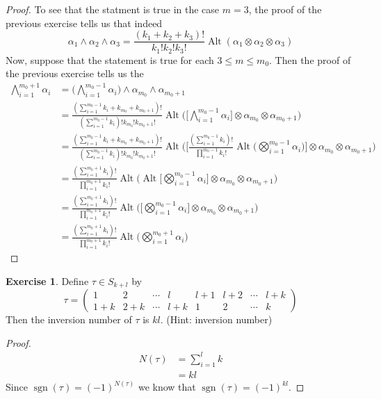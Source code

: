\documentclass{book}
\theoremstyle{definition}
\newtheorem{ex}[definition]{Exercise}
\newcommand{\al}{\alpha}
\DeclareMathOperator{\sgn}{sgn}
\DeclareMathOperator{\Alt}{Alt}
\DeclareMathOperator*{\0}{\mbf{0}}
\DeclareMathOperator*{\1}{\mbf{1}}
\begin{document}
	\begin{proof}
		To see that the statment is true in the case $m=3$, the proof of the previous exercise tells us that indeed $$\al_1 \wedge \al_2 \wedge \al_3 = \frac{(k_1 + k_2 + k_3)!}{k_1! k_2! k_3!}\Alt(\al_1 \otimes \al_2 \otimes \al_3)$$
		Now, suppose that the statement is true for each $3 \leq m \leq m_0$. Then the proof of the previous exercise tells us the 
		\begin{align*}
			\bigwedge_{i=1}^{m_0 +1} \al_i
			&= \bigg( \bigwedge_{i=1}^{m_0 -1} \al_i \bigg) \wedge \al_{m_0} \wedge \al_{m_0+1} \\
			&= \frac{(\sum_{i=1}^{m_0-1} k_i + k_{m_0} + k_{m_0+1})! }{(\sum_{i=1}^{m_0-1} k_i)! k_{m_0}! k_{m_0+1}!} \Alt \bigg( \bigg[ \bigwedge_{i=1}^{m_0-1} \al_i \bigg] \otimes \al_{m_0} \otimes \al_{m_0 +1}  \bigg) \\
			&= \frac{(\sum_{i=1}^{m_0-1} k_i + k_{m_0} + k_{m_0+1})! }{(\sum_{i=1}^{m_0-1} k_i)! k_{m_0}! k_{m_0+1}!} \Alt \bigg( \bigg[ \frac{(\sum_{i=1}^{m_0-1} k_i)!}{\prod_{i=1}^{m_0-1} k_i!} \Alt \bigg (\bigotimes_{i=1}^{m_0-1} \al_i \bigg) \bigg] \otimes \al_{m_0} \otimes \al_{m_0 +1}  \bigg) \\
			&= \frac{(\sum_{i=1}^{m_0+1} k_i)! }{ \prod_{i=1}^{m_0+1} k_i!}\Alt \bigg( \Alt \bigg [ \bigotimes_{i=1}^{m_0-1} \al_i \bigg] \otimes \al_{m_0} \otimes \al_{m_0 +1}  \bigg) \\
			&= \frac{(\sum_{i=1}^{m_0+1} k_i)! }{ \prod_{i=1}^{m_0+1} k_i!}\Alt \bigg( \bigg [ \bigotimes_{i=1}^{m_0-1} \al_i \bigg] \otimes \al_{m_0} \otimes \al_{m_0 +1}  \bigg) \\
			&= \frac{(\sum_{i=1}^{m_0+1} k_i)! }{ \prod_{i=1}^{m_0+1} k_i!}\Alt \bigg(  \bigotimes_{i=1}^{m_0+1} \al_i   \bigg) 
		\end{align*}
	\end{proof}
	
	\begin{ex}
		Define $\tau \in S_{k+l}$ by 
		\[\tau = 
		\begin{pmatrix}
			1 & 2 & \cdots &l &l+1 & l+2 & \cdots & l+k \\
			1+k & 2+ k & \cdots & l+k & 1 & 2 & \cdots & k 
		\end{pmatrix} 
		\]
		Then the inversion number of $\tau$ is $kl$.
		(Hint: inversion number)
	\end{ex}

	\begin{proof}
		\begin{align*}
			N(\tau) 
			&= \sum_{i = 1}^l k \\
			&= kl
		\end{align*}
		Since $\sgn (\tau) = (-1)^{N(\tau)}$ we know that  $\sgn(\tau) = (-1)^{kl}$.
	\end{proof}
\end{document}
